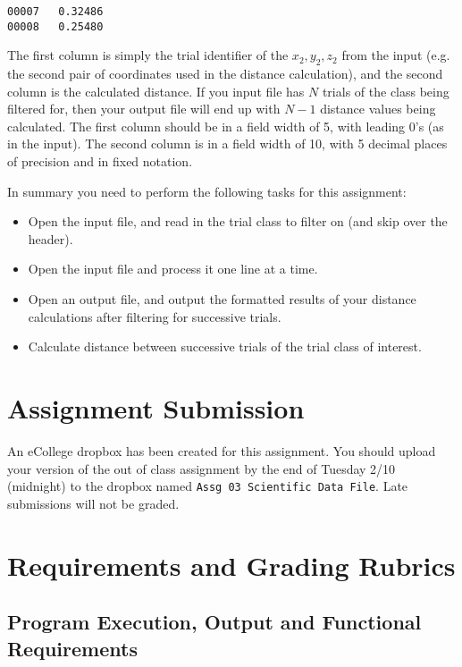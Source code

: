 \documentclass[11pt]{article}
\begin{document}
\begin{verbatim}
00007   0.32486
00008   0.25480
\end{verbatim}

The first column is simply the trial identifier of the $x_2, y_2, z_2$
from the input (e.g.  the second pair of coordinates used in the
distance calculation), and the second column is the calculated
distance.  If you input file has $N$ trials of the class being
filtered for, then your output file will end up with $N-1$ distance
values being calculated.  The first column should be in a field width
of 5, with leading 0's (as in the input).  The second column is in a
field width of 10, with 5 decimal places of precision and in fixed
notation.

In summary you need to perform the following tasks for this assignment:

\begin{itemize}
\item Open the input file, and read in the trial class to filter on (and
  skip over the header).
\item Open the input file and process it one line at a time.
\item Open an output file, and output the formatted results of your
  distance calculations after filtering for successive trials.
\item Calculate distance between successive trials of the trial class
  of interest.
\end{itemize}
\section*{Assignment Submission}
\label{sec-4}


An eCollege dropbox has been created for this assignment.  You should
upload your version of the out of class assignment by the end of
Tuesday 2/10 (midnight) to the dropbox named \verb~Assg 03 Scientific Data File~.
Late submissions will not be graded.
\section*{Requirements and Grading Rubrics}
\label{sec-5}
\subsection*{Program Execution, Output and Functional Requirements}
\label{sec-5-1}
\end{document}
